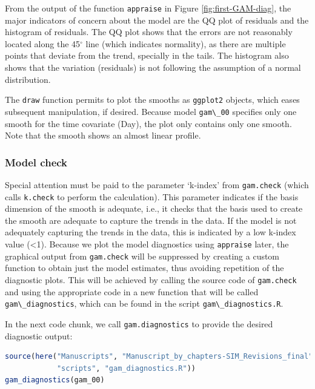 \documentclass[
]{article}
\newcommand{\passthrough}[1]{#1}
\begin{document}
From the output of the function \passthrough{\lstinline!appraise!} in Figure \ref{fig:first-GAM-diag}, the major indicators of concern about the model are the QQ plot of residuals and the histogram of residuals. The QQ plot shows that the errors are not reasonably located along the 45\(^{\circ}\) line (which indicates normality), as there are multiple points that deviate from the trend, specially in the tails. The histogram also shows that the variation (residuals) is not following the assumption of a normal distribution.

The \passthrough{\lstinline!draw!} function permits to plot the smooths as \passthrough{\lstinline!ggplot2!} objects, which eases subsequent manipulation, if desired. Because model \passthrough{\lstinline!gam\_00!} specifies only one smooth for the time covariate (Day), the plot only contains only one smooth. Note that the smooth shows an almost linear profile.

\hypertarget{gam-00-model-check}{%
\subsubsection{Model check}\label{gam-00-model-check}}

Special attention must be paid to the parameter `k-index' from \passthrough{\lstinline!gam.check!} (which calls \passthrough{\lstinline!k.check!} to perform the calculation). This parameter indicates if the basis dimension of the smooth is adequate, i.e., it checks that the basis used to create the smooth are adequate to capture the trends in the data. If the model is not adequately capturing the trends in the data, this is indicated by a low k-index value (\textless1). Because we plot the model diagnostics using \passthrough{\lstinline!appraise!} later, the graphical output from \passthrough{\lstinline!gam.check!} will be suppressed by creating a custom function to obtain just the model estimates, thus avoiding repetition of the diagnostic plots. This will be achieved by calling the source code of \passthrough{\lstinline!gam.check!} and using the appropriate code in a new function that will be called \passthrough{\lstinline!gam\_diagnostics!}, which can be found in the script \passthrough{\lstinline!gam\_diagnostics.R!}.

In the next code chunk, we call \passthrough{\lstinline!gam.diagnostics!} to provide the desired diagnostic output:

\begin{lstlisting}[language=R]
source(here("Manuscripts", "Manuscript_by_chapters-SIM_Revisions_final",
            "scripts", "gam_diagnostics.R"))
gam_diagnostics(gam_00)
\end{lstlisting}
\end{document}

